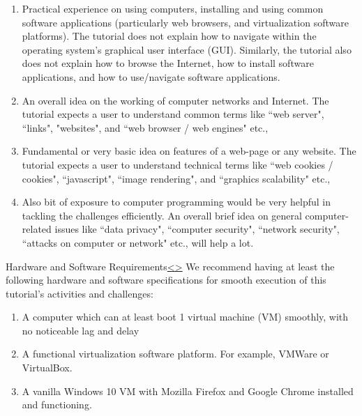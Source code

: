 \documentclass[12pt]{extarticle}
\newenvironment{instructionblock}{\Large\bgroup}{\egroup}
\newcommand{\ben}{\begin{enumerate}}
\newcommand{\een}{\end{enumerate}}
\begin{document}
	\ben
	
	
	\item Practical experience on using computers, installing and using common software applications (particularly web browsers, and virtualization software platforms). The tutorial does not explain how to navigate within the operating system's graphical user interface (GUI). Similarly, the tutorial also does not explain how to browse the Internet, how to install software applications, and how to use/navigate software applications. 
	
	\item An overall idea on the working of computer networks and Internet. The tutorial expects a user to understand common terms like ``web server", ``links", "websites", and ``web browser / web engines" etc., 
	
	\item Fundamental or very basic idea on features of a web-page or any website. The tutorial expects a user to understand technical terms like ``web cookies / cookies", ``javascript", ``image rendering", and ``graphics scalability" etc.,
	
	\item Also bit of exposure to computer programming would be very helpful in tackling the challenges efficiently. An overall brief idea on general computer-related issues like ``data privacy", ``computer security", ``network security", ``attacks on computer or network" etc., will help a lot.
	
	
	\een 







	\pagebreak
	\begin{slide}{Hardware and Software Requirements}{\hyperref[slide 2]{\textless}\hyperref[slide 4]{\textgreater}}
		\begin{instructionblock}
			We recommend having at least the following hardware and software specifications for smooth execution of this tutorial's activities and challenges:
			\begin{enumerate}
				\item {A computer which can at least boot 1 virtual machine (VM) smoothly, with no noticeable lag and delay}
				\item {A functional virtualization software platform. For example, VMWare or VirtualBox.}
				\item {A vanilla Windows 10 VM with Mozilla Firefox and Google Chrome installed and functioning.  }
			\end{enumerate}
		\end{instructionblock}
	\end{slide}
	
\end{document}
